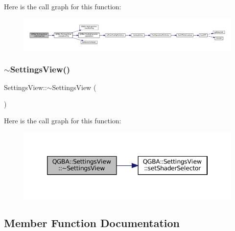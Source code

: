 Here is the call graph for this function\+:
\nopagebreak
\begin{figure}[H]
\begin{center}
\leavevmode
\includegraphics[width=350pt]{class_q_g_b_a_1_1_settings_view_aab1ad8a93c4118a33534328f70ecb54f_cgraph}
\end{center}
\end{figure}
\mbox{\label{class_q_g_b_a_1_1_settings_view_a3287e7c87008472a93bbc10fe331b6c2}} 
\subsubsection{\texorpdfstring{$\sim$\+Settings\+View()}{~SettingsView()}}
{\footnotesize\ttfamily Settings\+View\+::$\sim$\+Settings\+View (\begin{DoxyParamCaption}{ }\end{DoxyParamCaption})}

Here is the call graph for this function\+:
\nopagebreak
\begin{figure}[H]
\begin{center}
\leavevmode
\includegraphics[width=346pt]{class_q_g_b_a_1_1_settings_view_a3287e7c87008472a93bbc10fe331b6c2_cgraph}
\end{center}
\end{figure}


\subsection{Member Function Documentation}
\mbox{\label{class_q_g_b_a_1_1_settings_view_af17733fea12d5dba72604c1a837cb7e9}} 
